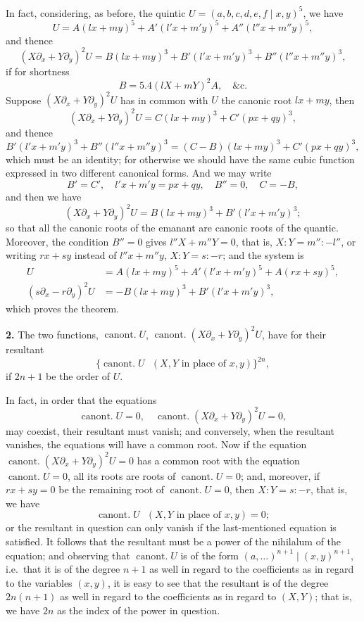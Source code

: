 \documentclass[11pt,a4paper]{article}
\newcommand{\canont}{\operatorname{canont.}}
\begin{document}
In fact, considering, as before, the quintic $U=(a,b,c,d,e,f\mid x,y)^5$, we have
\[
U = A(lx+my)^5 + A'(l'x+m'y)^5 + A''(l''x+m''y)^5,
\]
and thence
\[
(X\partial_x + Y\partial_y)^2 U = B(lx+my)^3 + B'(l'x+m'y)^3 + B''(l''x+m''y)^3,
\]
if for shortness
\[
B = 5.4(lX+mY)^2 A, \quad \text{\&c.}
\]
Suppose $(X\partial_x + Y\partial_y)^2 U$ has in common with $U$ the canonic root $lx+my$, then
\[
(X\partial_x + Y\partial_y)^2 U = C(lx+my)^3 + C'(px+qy)^3,
\]
and thence
\[
B'(l'x+m'y)^3 + B''(l''x+m''y)^3 = (C-B)(lx+my)^3 + C'(px+qy)^3,
\]
which must be an identity; for otherwise we should have the same cubic function expressed in two different canonical forms. And we may write
\[
B' = C', \quad l'x+m'y = px+qy, \quad B'' = 0, \quad C = -B,
\]
and then we have
\[
(X\partial_x + Y\partial_y)^2 U = B(lx+my)^3 + B'(l'x+m'y)^3;
\]
so that all the canonic roots of the emanant are canonic roots of the quantic. Moreover, the condition $B''=0$ gives $l''X+m''Y=0$, that is, $X:Y = m'':-l''$, or writing $rx+sy$ instead of $l''x+m''y$, $X:Y = s:-r$; and the system is
\begin{align*}
U &= A(lx+my)^5 + A'(l'x+m'y)^5 + A(rx+sy)^5,\\
(s\partial_x - r\partial_y)^2 U &= -B(lx+my)^3 + B'(l'x+m'y)^3,
\end{align*}
which proves the theorem.

\medskip
\noindent \textbf{2.} The two functions, $\canont U$, $\canont (X\partial_x + Y\partial_y)^2 U$, have for their resultant
\[\{\canont U \text{ } (X,Y \text{ in place of } x,y)\}^{2n},\]
if $2n+1$ be the order of $U$.

In fact, in order that the equations
\[
\canont U = 0, \quad \canont (X\partial_x + Y\partial_y)^2 U = 0,
\]
may coexist, their resultant must vanish; and conversely, when the resultant vanishes, the equations will have a common root. Now if the equation $\canont (X\partial_x + Y\partial_y)^2 U = 0$ has a common root with the equation $\canont U = 0$, all its roots are roots of $\canont U=0$; and, moreover, if $rx+sy=0$ be the remaining root of $\canont U=0$, then $X:Y = s:-r$, that is, we have
\[
\canont U \text{ } (X,Y \text{ in place of } x,y) = 0;
\]
or the resultant in question can only vanish if the last-mentioned equation is satisfied. It follows that the resultant must be a power of the nihilalum of the equation; and observing that $\canont U$ is of the form $(a,\ldots)^{n+1}\mid (x,y)^{n+1}$, i.e.\ that it is of the degree $n+1$ as well in regard to the coefficients as in regard to the variables $(x,y)$, it is easy to see that the resultant is of the degree $2n(n+1)$ as well in regard to the coefficients as in regard to $(X,Y)$; that is, we have $2n$ as the index of the power in question.
\end{document}
